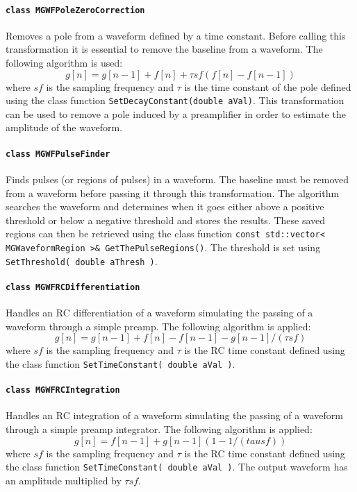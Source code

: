 			\paragraph{\lstinline!class MGWFPoleZeroCorrection!} 

Removes a pole from a waveform defined by a time constant.  Before calling this transformation it is essential to remove the baseline from a waveform.  The following algorithm is used:
				\[
				g[n] = g[n-1] + f[n] + \tau sf(f[n] - f[n-1])
				\]
where $sf$ is the sampling frequency and $\tau$ is the time constant of the pole defined using the class function \lstinline!SetDecayConstant(double aVal)!.  This transformation can be used to remove a pole induced by a preamplifier in order to estimate the amplitude of the waveform.
			
			\paragraph{\lstinline!class MGWFPulseFinder!} 

Finds pulses (or regions of pulses) in a waveform.  The baseline must be removed from a waveform before passing it through this transformation.  The algorithm searches the waveform and determines when it goes either above a positive threshold or below a negative threshold and stores the results.  These saved regions can then be retrieved using the class function \lstinline!const std::vector< MGWaveformRegion >& GetThePulseRegions()!.  The threshold is set using \lstinline!SetThreshold( double aThresh )!.
		
			\paragraph{\lstinline!class MGWFRCDifferentiation!} 

Handles an RC differentiation of a waveform simulating the passing of a waveform through a simple preamp.  The following algorithm is applied:
				\[
				 g[n] = g[n-1] + f[n] - f[n-1] - g[n-1]/(\tau sf)
				\]
where $sf$ is the sampling frequency and $\tau$ is the RC time constant defined using the class function \lstinline!SetTimeConstant( double aVal )!.

			\paragraph{\lstinline!class MGWFRCIntegration!} 

Handles an RC integration of a waveform simulating the passing of a waveform through a simple preamp integrator.  The following algorithm is applied:
				\[
				g[n] = f[n-1] + g[n-1] (1 - 1/(tau sf) )
				\]
where $sf$ is the sampling frequency and $\tau$ is the RC time constant defined using the class function \lstinline!SetTimeConstant( double aVal )!.  The output waveform has an amplitude multiplied by $\tau sf$.

